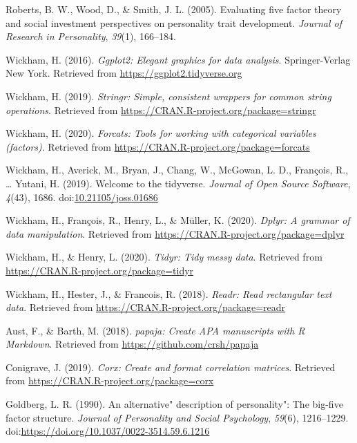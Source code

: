 \documentclass[
  man,floatsintext]{apa6}
\begin{document}
\leavevmode\hypertarget{ref-roberts2005}{}%
Roberts, B. W., Wood, D., \& Smith, J. L. (2005). Evaluating five factor theory and social investment perspectives on personality trait development. \emph{Journal of Research in Personality}, \emph{39}(1), 166--184.

\leavevmode\hypertarget{ref-R-ggplot2}{}%
Wickham, H. (2016). \emph{Ggplot2: Elegant graphics for data analysis}. Springer-Verlag New York. Retrieved from \url{https://ggplot2.tidyverse.org}

\leavevmode\hypertarget{ref-R-stringr}{}%
Wickham, H. (2019). \emph{Stringr: Simple, consistent wrappers for common string operations}. Retrieved from \url{https://CRAN.R-project.org/package=stringr}

\leavevmode\hypertarget{ref-R-forcats}{}%
Wickham, H. (2020). \emph{Forcats: Tools for working with categorical variables (factors)}. Retrieved from \url{https://CRAN.R-project.org/package=forcats}

\leavevmode\hypertarget{ref-R-tidyverse}{}%
Wickham, H., Averick, M., Bryan, J., Chang, W., McGowan, L. D., François, R., \ldots{} Yutani, H. (2019). Welcome to the tidyverse. \emph{Journal of Open Source Software}, \emph{4}(43), 1686. doi:\href{https://doi.org/10.21105/joss.01686}{10.21105/joss.01686}

\leavevmode\hypertarget{ref-R-dplyr}{}%
Wickham, H., François, R., Henry, L., \& Müller, K. (2020). \emph{Dplyr: A grammar of data manipulation}. Retrieved from \url{https://CRAN.R-project.org/package=dplyr}

\leavevmode\hypertarget{ref-R-tidyr}{}%
Wickham, H., \& Henry, L. (2020). \emph{Tidyr: Tidy messy data}. Retrieved from \url{https://CRAN.R-project.org/package=tidyr}

\leavevmode\hypertarget{ref-R-readr}{}%
Wickham, H., Hester, J., \& Francois, R. (2018). \emph{Readr: Read rectangular text data}. Retrieved from \url{https://CRAN.R-project.org/package=readr}

\leavevmode\hypertarget{ref-R-papaja}{}%
Aust, F., \& Barth, M. (2018). \emph{papaja: Create APA manuscripts with R Markdown}. Retrieved from \url{https://github.com/crsh/papaja}

\leavevmode\hypertarget{ref-R-corx}{}%
Conigrave, J. (2019). \emph{Corx: Create and format correlation matrices}. Retrieved from \url{https://CRAN.R-project.org/package=corx}

\leavevmode\hypertarget{ref-goldberg1990alternative}{}%
Goldberg, L. R. (1990). An alternative" description of personality": The big-five factor structure. \emph{Journal of Personality and Social Psychology}, \emph{59}(6), 1216--1229. doi:\href{https://doi.org/https://doi.org/10.1037/0022-3514.59.6.1216}{https://doi.org/10.1037/0022-3514.59.6.1216}
\end{document}
